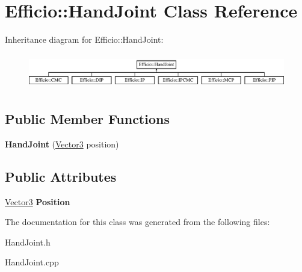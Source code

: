 \hypertarget{class_efficio_1_1_hand_joint}{}\section{Efficio\+:\+:Hand\+Joint Class Reference}
\label{class_efficio_1_1_hand_joint}
Inheritance diagram for Efficio\+:\+:Hand\+Joint\+:\begin{figure}[H]
\begin{center}
\leavevmode
\includegraphics[height=1.568627cm]{class_efficio_1_1_hand_joint}
\end{center}
\end{figure}
\subsection*{Public Member Functions}
\begin{DoxyCompactItemize}
\item 
\hypertarget{class_efficio_1_1_hand_joint_a29681e05e25bc27a4c36c91476529305}{}\label{class_efficio_1_1_hand_joint_a29681e05e25bc27a4c36c91476529305} 
{\bfseries Hand\+Joint} (\hyperlink{class_efficio_1_1_vector3}{Vector3} position)
\end{DoxyCompactItemize}
\subsection*{Public Attributes}
\begin{DoxyCompactItemize}
\item 
\hypertarget{class_efficio_1_1_hand_joint_a326570c8804140f4427c959c169a8e9c}{}\label{class_efficio_1_1_hand_joint_a326570c8804140f4427c959c169a8e9c} 
\hyperlink{class_efficio_1_1_vector3}{Vector3} {\bfseries Position}
\end{DoxyCompactItemize}


The documentation for this class was generated from the following files\+:\begin{DoxyCompactItemize}
\item 
Hand\+Joint.\+h\item 
Hand\+Joint.\+cpp\end{DoxyCompactItemize}
